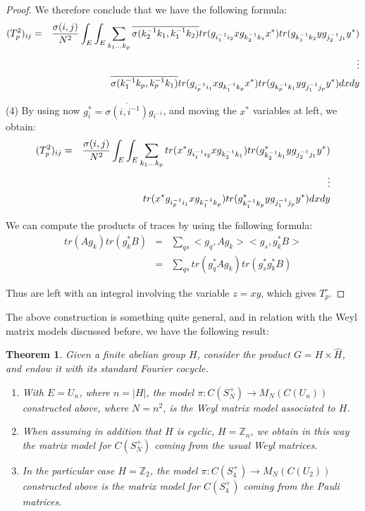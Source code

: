 \documentclass[12pt]{amsbook}
\newtheorem{theorem}{Theorem}[chapter]
\begin{document}
\begin{proof}
We therefore conclude that we have the following formula:
\begin{eqnarray*}
(T_p^2)_{ij}
&=&\frac{\sigma(i,j)}{N^2}\int_E\int_E\sum_{k_1\ldots k_p}
\overline{\sigma(k_2^{-1}k_1,k_1^{-1}k_2)}tr(g_{i_1^{-1}i_2}xg_{k_2^{-1}k_1}x^*)tr(g_{k_1^{-1}k_2}yg_{j_2^{-1}j_1}y^*)\\
&&\hskip50mm\vdots\\
&&\hskip10mm\overline{\sigma(k_1^{-1}k_p,k_p^{-1}k_1)}tr(g_{i_p^{-1}i_1}xg_{k_1^{-1}k_p}x^*)tr(g_{k_p^{-1}k_1}yg_{j_1^{-1}j_p}y^*)dxdy
\end{eqnarray*}

(4) By using now $g_i^*=\overline{\sigma(i,i^{-1})}g_{i^{-1}}$, and moving the $x^*$ variables at left, we obtain:
\begin{eqnarray*}
(T_p^2)_{ij}
&=&\frac{\sigma(i,j)}{N^2}\int_E\int_E\sum_{k_1\ldots k_p}
tr(x^*g_{i_1^{-1}i_2}xg_{k_2^{-1}k_1})tr(g_{k_2^{-1}k_1}^*yg_{j_2^{-1}j_1}y^*)\\
&&\hskip50mm\vdots\\
&&\hskip10mm tr(x^*g_{i_p^{-1}i_1}xg_{k_1^{-1}k_p})tr(g_{k_1^{-1}k_p}^*yg_{j_1^{-1}j_p}y^*)dxdy
\end{eqnarray*}

We can compute the products of traces by using the following formula:
\begin{eqnarray*}
tr(Ag_k)tr(g_k^*B)
&=&\sum_{qs}<g_q,Ag_k><g_s,g_k^*B>\\
&=&\sum_{qs}tr(g_q^*Ag_k)tr(g_s^*g_k^*B)
\end{eqnarray*}

Thus are left with an integral involving the variable $z=xy$, which gives $T_p^\circ$.
\end{proof}

The above construction is something quite general, and in relation with the Weyl matrix models discussed before, we have the following result:

\begin{theorem}
Given a finite abelian group $H$, consider the product $G=H\times\widehat{H}$, and endow it with its standard Fourier cocycle. 
\begin{enumerate}
\item With $E=U_n$, where $n=|H|$, the model $\pi:C(S_N^+)\to M_N(C(U_n))$ constructed above, where $N=n^2$, is the Weyl matrix model associated to $H$.

\item When assuming in addition that $H$ is cyclic, $H=\mathbb Z_n$, we obtain in this way the matrix model for $C(S_N^+)$ coming from the usual Weyl matrices.

\item In the particular case $H=\mathbb Z_2$, the model $\pi:C(S_4^+)\to M_N(C(U_2))$ constructed above is the matrix model for $C(S_4^+)$ coming from the Pauli matrices.
\end{enumerate}
\end{theorem}
\end{document}
